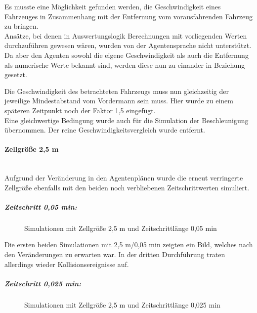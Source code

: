 Es musste eine Möglichkeit gefunden werden, die Geschwindigkeit eines Fahrzeuges in Zusammenhang mit der Entfernung vom vorausfahrenden Fahrzeug zu bringen.
\\
Ansätze, bei denen in Auswertungslogik Berechnungen mit vorliegenden Werten durchzuführen gewesen wären, wurden von der Agentensprache nicht unterstützt.
\\
Da aber den Agenten sowohl die eigene Geschwindigkeit als auch die Entfernung als numerische Werte bekannt sind, werden diese nun zu einander in Beziehung gesetzt.

Die Geschwindigkeit des betrachteten Fahrzeugs muss nun gleichzeitig der jeweilige Mindestabstand vom Vordermann sein muss. 
Hier wurde zu einem späteren Zeitpunkt noch der Faktor 1,5 eingefügt.
\\
Eine gleichwertige Bedingung wurde auch für die Simulation der Beschleunigung übernommen.
Der reine Geschwindigkeitsvergleich wurde entfernt.


\paragraph*{Zellgröße 2,5 m}
\hfill \\
Aufgrund der Veränderung in den Agentenplänen wurde die erneut verringerte Zellgröße ebenfalls mit den beiden noch verbliebenen Zeitschrittwerten simuliert.

\subparagraph*{Zeitschritt 0,05 min:}
\begin{figure}[hptb]
  \centering 
   \qquad 
   \qquad 
  \caption{Simulationen mit Zellgröße 2,5 m und Zeitschrittlänge 0,05 min} 
  \label{figure:run24-26}
\end{figure}

Die ersten beiden Simulationen mit 2,5 m/0,05 min zeigten ein Bild, welches nach den Veränderungen zu erwarten war.
In der dritten Durchführung traten allerdings wieder Kollisionsereignisse auf.

\subparagraph*{Zeitschritt 0,025 min:}
\begin{figure}[hptb]
  \centering 
   \qquad 
   \qquad 
  \caption{Simulationen mit Zellgröße 2,5 m und Zeitschrittlänge 0,025 min} 
  \label{figure:run27-29}
\end{figure}

